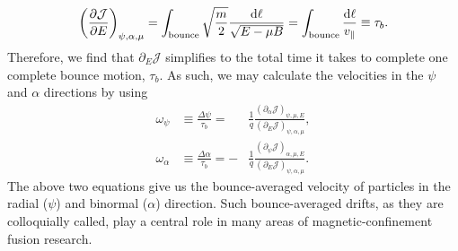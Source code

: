 \begin{equation}
    \left(\frac{\partial \mathcal{J}}{\partial E}\right)_{\psi,\alpha,\mu} = \int_{\rm bounce} \sqrt{\frac{m}{2}} \frac{\mathrm{d}\ell}{\sqrt{E - \mu B}} = \int_{\rm bounce} \frac{\mathrm{d} \ell}{v_\parallel} \equiv \tau_b.
\end{equation}
Therefore, we find that $\partial_E \mathcal{J}$ simplifies to the total time it takes to complete one complete bounce motion, $\tau_b$. As such, we may calculate the velocities in the $\psi$ and $\alpha$ directions by using 
\begin{subequations}
\begin{alignat}{4}
\omega_\psi &\equiv \frac{\Delta \psi}{\tau_b} = &\frac{1}{q} \frac{\left( \partial_\alpha \mathcal{J} \right)_{\psi,\mu,E}}{\left(\partial_E \mathcal{J}\right)_{\psi,\alpha,\mu}}, \\
\omega_\alpha &\equiv \frac{\Delta \alpha}{\tau_b} = - &\frac{1}{q} \frac{\left( \partial_\psi \mathcal{J} \right)_{\alpha,\mu,E}}{\left(\partial_E \mathcal{J}\right)_{\psi,\alpha,\mu}}. \label{eq: omega_alpha}
\end{alignat}
\end{subequations}
The above two equations give us the bounce-averaged velocity of particles in the radial ($\psi$) and binormal ($\alpha$) direction. Such bounce-averaged drifts, as they are colloquially called, play a central role in many areas of magnetic-confinement fusion research.
